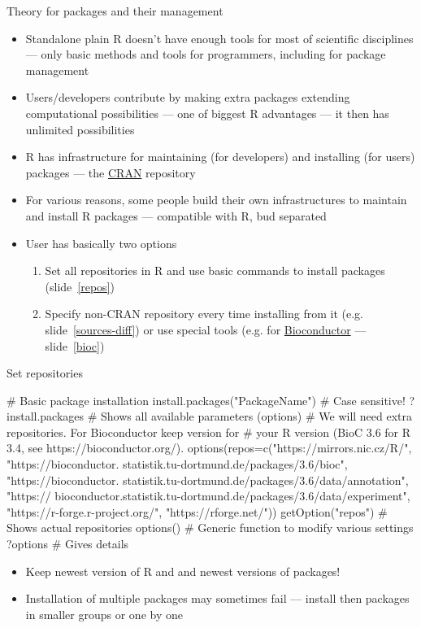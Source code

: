 \documentclass[compress, ucs, xelatex, 11pt, xcolor=svgnames,
  hyperref={
    bookmarks=true,
    unicode=true,
    colorlinks=true,
    pdftitle={Molecular data in R},
    plainpages=false,
    pdfauthor={Vojtech Zeisek},
    pdfsubject={Course about phylogeny and evolution in R},
    pdfcreator={XeLaTeX},
    pdfkeywords={R, evolution, phylogeny, molecular data},
    linkcolor=Tomato,
    anchorcolor=SaddleBrown,
    citecolor=Goldenrod,
    filecolor=DarkMagenta,
    menucolor=Sienna,
    urlcolor=DarkTurquoise,
    pdftex},
  url={hyphens, lowtilde} %
  ]{beamer}
\begin{document}
\begin{frame}{Theory for packages and their management}
  \begin{itemize}
    \item Standalone plain R doesn't have enough tools for most of scientific disciplines --- only basic methods and tools for programmers, including for package management
    \item Users/developers contribute by making extra packages extending computational possibilities --- one of biggest R advantages --- it then has unlimited possibilities
    \item R has infrastructure for maintaining (for developers) and installing (for users) packages --- the \href{https://cran.r-project.org/}{CRAN} repository
    \item For various reasons, some people build their own infrastructures to maintain and install R packages --- compatible with R, bud separated
    \item User has basically two options
    \begin{enumerate}
      \item Set all repositories in R and use basic commands to install packages (slide~\ref{repos})
      \item Specify non-CRAN repository every time installing from it (e.g. slide~\ref{sources-diff}) or use special tools (e.g. for \href{http://bioconductor.org/install/}{Bioconductor} --- slide~\ref{bioc})
    \end{enumerate}
  \end{itemize}
\end{frame}

\begin{frame}[fragile]{Set repositories}
  \label{repos}
  \begin{spluscode}
    # Basic package installation
    install.packages("PackageName") # Case sensitive!
    ?install.packages # Shows all available parameters (options)
    # We will need extra repositories. For Bioconductor keep version for
    # your R version (BioC 3.6 for R 3.4, see https://bioconductor.org/).
    options(repos=c("https://mirrors.nic.cz/R/", "https://bioconductor.
      statistik.tu-dortmund.de/packages/3.6/bioc", "https://bioconductor.
      statistik.tu-dortmund.de/packages/3.6/data/annotation", "https://
      bioconductor.statistik.tu-dortmund.de/packages/3.6/data/experiment", 
      "https://r-forge.r-project.org/", "https://rforge.net/"))
    getOption("repos") # Shows actual repositories
    options() # Generic function to modify various settings
    ?options # Gives details
  \end{spluscode}
  \begin{itemize}
    \item \alert{Keep newest version of R and and newest versions of packages!}
    \item Installation of multiple packages may sometimes fail --- install then packages in smaller groups or one by one
  \end{itemize}
\end{frame}
\end{document}
